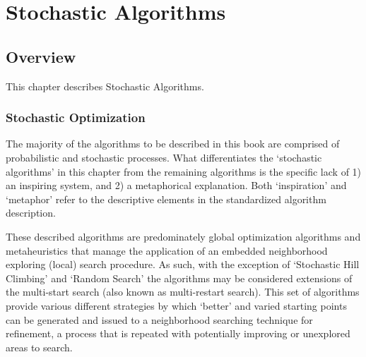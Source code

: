 

\renewcommand{\bibsection}{\subsection{\bibname}}

\chapter{Stochastic Algorithms}
\label{ch:stochastic}

% 
% 
\section{Overview}
This chapter describes Stochastic Algorithms.

\subsection{Stochastic Optimization}
The majority of the algorithms to be described in this book are comprised of probabilistic and stochastic processes. What differentiates the `stochastic algorithms' in this chapter from the remaining algorithms is the specific lack of 1) an inspiring system, and 2) a metaphorical explanation. Both `inspiration' and `metaphor' refer to the descriptive elements in the standardized algorithm description.

These described algorithms are predominately global optimization algorithms and metaheuristics that manage the application of an embedded neighborhood exploring (local) search procedure. As such, with the exception of `Stochastic Hill Climbing' and `Random Search' the algorithms may be considered extensions of the multi-start search (also known as multi-restart search). This set of algorithms provide various different strategies by which `better' and varied starting points can be generated and issued to a neighborhood searching technique for refinement, a process that is repeated with potentially improving or unexplored areas to search. 

